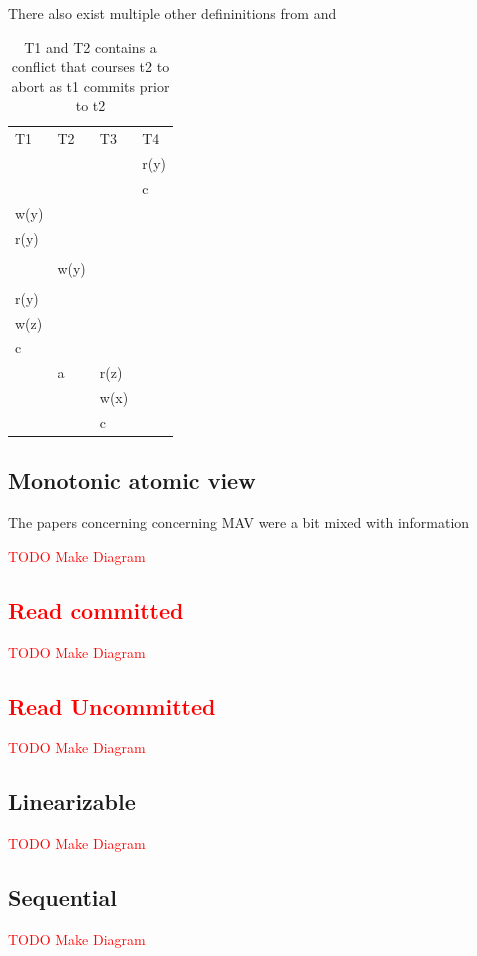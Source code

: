 \documentclass[a4paper,10pt,titlepage]{report}
\begin{document}
There also exist multiple other defininitions from \cite{CeroneBernardiGotsman} and \cite{CrooksPuAlvisiClement}


\begin{table}[h]
\begin{tabular}{l|l|l|l}
T1   & T2   & T3   & T4   \\
     &      &      & r(y) \\
     &      &      & c    \\
w(y) &      &      &      \\
r(y) &      &      &      \\
     &      &      &      \\
     & w(y) &      &      \\
     &      &      &      \\
r(y) &      &      &      \\
w(z) &      &      &      \\
c    &      &      &      \\
     & a    & r(z) &      \\
     &      & w(x) &      \\
     &      & c    &      
\end{tabular}
\caption{T1 and T2 contains a conflict that courses t2 to abort as t1 commits prior to t2}
\end{table}

\subsection{Monotonic atomic view}
The papers concerning concerning MAV were a bit mixed with information 



\textcolor{red}{TODO Make Diagram


\subsection{Read committed}
\textcolor{red}{TODO Make Diagram}
\subsection{Read Uncommitted}
\textcolor{red}{TODO Make Diagram}

}
\subsection{Linearizable}
\textcolor{red}{TODO Make Diagram}
\subsection{Sequential}
\textcolor{red}{TODO Make Diagram}
\end{document}
